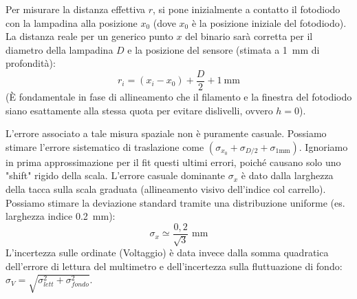 \documentclass[openany,a4paper,12pt]{book}
\begin{document}
Per misurare la distanza effettiva $r$, si pone inizialmente a contatto il fotodiodo con la lampadina alla posizione $x_0$ (dove $x_0$ è la posizione iniziale del fotodiodo). La distanza reale per un generico punto $x$ del binario sarà corretta per il diametro della lampadina $D$ e la posizione del sensore (stimata a \qty{1}{\milli\metre} di profondità):
\begin{equation}
    r_i = (x_i - x_0) + \frac{D}{2} + \qty{1}{\milli\metre}
\end{equation}
(È fondamentale in fase di allineamento che il filamento e la finestra del fotodiodo siano esattamente alla stessa quota per evitare dislivelli, ovvero $h=0$).

L'errore associato a tale misura spaziale non è puramente casuale. Possiamo stimare l'errore sistematico di traslazione come $(\sigma_{x_0} + \sigma_{D/2} + \sigma_{1\text{mm}})$. Ignoriamo in prima approssimazione per il fit questi ultimi errori, poiché causano solo uno "shift" rigido della scala.
L'errore casuale dominante $\sigma_x$ è dato dalla larghezza della tacca sulla scala graduata (allineamento visivo dell'indice col carrello). Possiamo stimare la deviazione standard tramite una distribuzione uniforme (es. larghezza indice \qty{0.2}{\milli\metre}):
\begin{equation}
    \sigma_x \simeq \frac{0{,}2}{\sqrt{3}} \text{ mm}
\end{equation}
L'incertezza sulle ordinate (Voltaggio) è data invece dalla somma quadratica dell'errore di lettura del multimetro e dell'incertezza sulla fluttuazione di fondo: $\sigma_V = \sqrt{\sigma_{lett}^2 + \sigma_{fondo}^2}$.
\end{document}
